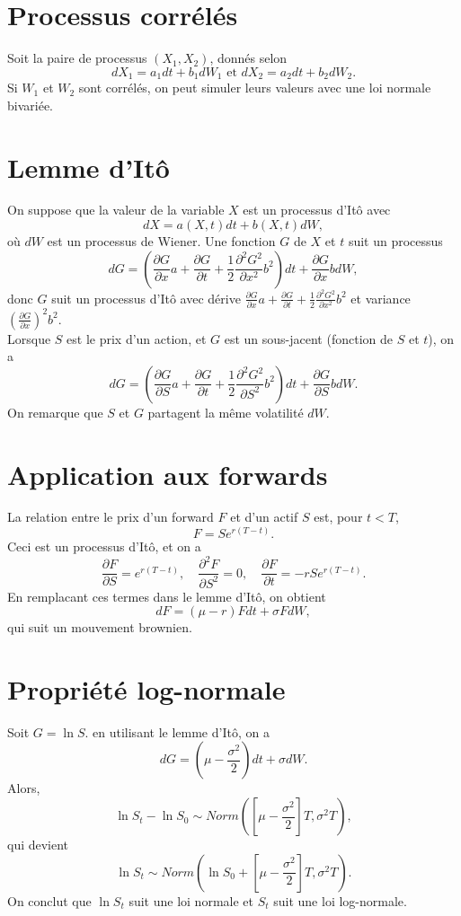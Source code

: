 \section{Processus corrélés}

Soit la paire de processus $(X_1, X_2)$, donnés selon
$$dX_1 = a_1 dt + b_1 dW_1 \text{  et  } dX_2 = a_2 dt + b_2 dW_2.$$
Si $W_1$ et $W_2$ sont corrélés, on peut simuler leurs valeurs avec une loi normale bivariée. 

\section{Lemme d'Itô}

On suppose que la valeur de la variable $X$ est un processus d'Itô avec 
$$dX = a(X, t) dt + b(X, t) dW,$$
où $dW$ est un processus de Wiener. Une fonction $G$ de $X$ et $t$ suit un processus
$$dG = \left(\frac{\partial G}{\partial x} a + \frac{\partial G}{\partial t} + \frac{1}{2} \frac{\partial^2 G^2}{\partial x^2}b^2\right)dt + \frac{\partial G}{\partial x} b dW,$$
donc $G$ suit un processus d'Itô avec dérive $\frac{\partial G}{\partial x} a + \frac{\partial G}{\partial t} + \frac{1}{2} \frac{\partial^2 G^2}{\partial x^2}b^2$ et variance $\left(\frac{\partial G}{\partial x}\right)^2 b^2.$\\

Lorsque $S$ est le prix d'un action, et $G$ est un sous-jacent (fonction de $S$ et $t$), on a
$$dG = \left(\frac{\partial G}{\partial S} a + \frac{\partial G}{\partial t} + \frac{1}{2} \frac{\partial^2 G^2}{\partial S^2}b^2\right)dt + \frac{\partial G}{\partial S} b dW.$$
On remarque que $S$ et $G$ partagent la même volatilité $dW$. 

\section{Application aux forwards}

La relation entre le prix d'un forward $F$ et d'un actif $S$ est, pour $t<T$, 
$$F = Se^{r(T-t)}.$$
Ceci est un processus d'Itô, et on a 
$$\frac{\partial F}{\partial S} = e^{r(T-t)}, \quad \frac{\partial^2 F}{\partial S^2} = 0, \quad \frac{\partial F}{\partial t} = -rSe^{r(T-t)}.$$
En remplacant ces termes dans le lemme d'Itô, on obtient
$$dF = (\mu - r) F dt + \sigma F dW,$$
qui suit un mouvement brownien. 

\section{Propriété log-normale}\label{sec:ln-prop}

Soit $G = \ln S$. en utilisant le lemme d'Itô, on a 
$$dG = \left(\mu - \frac{\sigma^2}{2}\right) dt + \sigma dW. $$
Alors, 
$$\ln S_t - \ln S_0 \sim Norm\left(\left[\mu - \frac{\sigma^2}{2}\right]T, \sigma^2 T\right),$$
qui devient
$$\ln S_t\sim Norm\left(\ln S_0 + \left[\mu - \frac{\sigma^2}{2}\right]T, \sigma^2 T\right).$$
On conclut que $\ln S_t$ suit une loi normale et $S_t$ suit une loi log-normale. 

